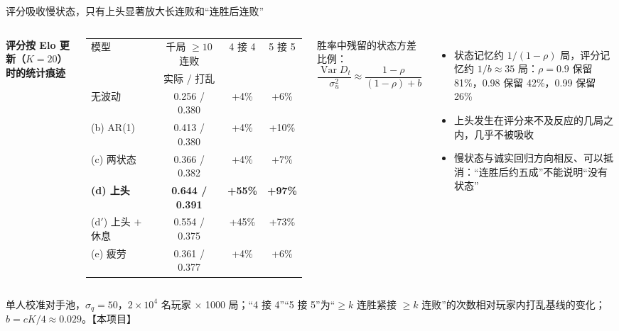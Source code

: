 \documentclass[aspectratio=169,11pt]{beamer}
\newcommand{\Var}{\operatorname{Var}}
\newcommand{\evtag}[2]{\mbox{\textcolor{#1}{\scriptsize【#2】}}}
\newcommand{\tagOwn}{\evtag{cRed}{本项目}}
\newcommand{\param}[1]{\par{\scriptsize\color{inkMuted}#1\par}}
\newcommand{\looselist}{\setlength{\itemsep}{4pt}\setlength{\parskip}{0pt}}
\begin{document}
\begin{frame}{评分吸收慢状态，只有上头显著放大长连败和“连胜后连败”}
\begin{columns}[T,onlytextwidth]
\footnotesize
\textbf{评分按 Elo 更新（$K=20$）时的统计痕迹}\par\smallskip
\renewcommand{\arraystretch}{1.2}
\begin{tabular}{@{}lccc@{}}
\toprule
模型 & 千局 $\ge10$ 连败 & 4 接 4 & 5 接 5 \\
     & {\scriptsize 实际 / 打乱} & & \\
\midrule
无波动 & 0.256 / 0.380 & +4\% & +6\% \\
(b) AR(1) & 0.413 / 0.380 & +4\% & +10\% \\
(c) 两状态 & 0.366 / 0.382 & +4\% & +7\% \\
\textbf{(d) 上头} & \textbf{0.644 / 0.391} & \textbf{+55\%} & \textbf{+97\%} \\
(d$'$) 上头 $+$ 休息 & 0.554 / 0.375 & +45\% & +73\% \\
(e) 疲劳 & 0.361 / 0.377 & +4\% & +6\% \\
\bottomrule
\end{tabular}
\begin{eqbox}\footnotesize
胜率中残留的状态方差比例：\\[2pt]
$\dfrac{\Var D_t}{\sigma_u^2}\approx\dfrac{1-\rho}{(1-\rho)+b}$
\end{eqbox}
\footnotesize
\begin{itemize}\looselist
  \item 状态记忆约 $1/(1-\rho)$ 局，评分记忆约 $1/b\approx35$ 局：$\rho=0.9$ 保留 81\%，0.98 保留 42\%，0.99 保留 26\%
  \item 上头发生在评分来不及反应的几局之内，几乎不被吸收
  \item 慢状态与诚实回归方向相反、可以抵消：“连胜后约五成”不能说明“没有状态”
\end{itemize}
\end{columns}
\param{单人校准对手池，$\sigma_q=50$，$2\times10^4$ 名玩家 $\times$ 1000 局；“4 接 4”“5 接 5”为“$\ge k$ 连胜紧接 $\ge k$ 连败”的次数相对玩家内打乱基线的变化；$b=cK/4\approx0.029$。\tagOwn}
\end{frame}
\end{document}
